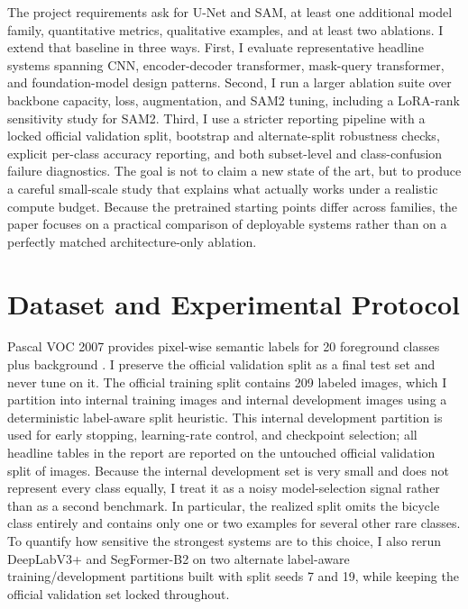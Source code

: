 \documentclass{article}
\begin{document}
The project requirements ask for U-Net and SAM, at least one additional model family, quantitative metrics, qualitative examples, and at least two ablations. I extend that baseline in three ways. First, I evaluate \HeadlineModelCount{} representative headline systems spanning CNN, encoder-decoder transformer, mask-query transformer, and foundation-model design patterns. Second, I run a larger ablation suite over backbone capacity, loss, augmentation, and SAM2 tuning, including a LoRA-rank sensitivity study for SAM2. Third, I use a stricter reporting pipeline with a locked official validation split, bootstrap and alternate-split robustness checks, explicit per-class accuracy reporting, and both subset-level and class-confusion failure diagnostics. The goal is not to claim a new state of the art, but to produce a careful small-scale study that explains what actually works under a realistic compute budget. Because the pretrained starting points differ across families, the paper focuses on a practical comparison of deployable systems rather than on a perfectly matched architecture-only ablation.

\section{Dataset and Experimental Protocol}

Pascal VOC 2007 provides pixel-wise semantic labels for 20 foreground classes plus background \citep{everingham2010pascal}. I preserve the official validation split as a final test set and never tune on it. The official training split contains 209 labeled images, which I partition into \InternalTrainCount{} internal training images and \InternalDevCount{} internal development images using a deterministic label-aware split heuristic. This internal development partition is used for early stopping, learning-rate control, and checkpoint selection; all headline tables in the report are reported on the untouched official validation split of \OfficialValCount{} images. Because the internal development set is very small and does not represent every class equally, I treat it as a noisy model-selection signal rather than as a second benchmark. In particular, the realized split omits the bicycle class entirely and contains only one or two examples for several other rare classes. To quantify how sensitive the strongest systems are to this choice, I also rerun DeepLabV3+ and SegFormer-B2 on two alternate label-aware training/development partitions built with split seeds 7 and 19, while keeping the official validation set locked throughout.
\end{document}
